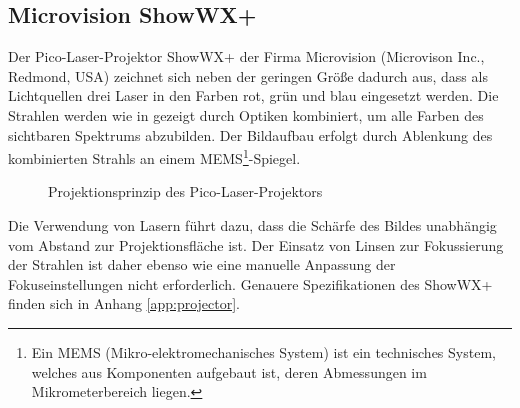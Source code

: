 

\prever{
}

\subsection{Microvision ShowWX+\textsuperscript{\texttrademark}}%
\label{chap.projector}
Der Pico-Laser-Projektor ShowWX+\textsuperscript{\texttrademark} der Firma Microvision (Microvison Inc., Redmond, USA) zeichnet sich neben der geringen Größe dadurch aus, dass als Lichtquellen drei Laser in den Farben rot, grün und blau eingesetzt werden. Die Strahlen werden wie in  gezeigt durch Optiken kombiniert, um alle Farben des sichtbaren Spektrums abzubilden. Der Bildaufbau erfolgt durch Ablenkung des kombinierten Strahls an einem MEMS\footnote{Ein MEMS (Mikro-elektromechanisches System) ist ein technisches System, welches aus Komponenten aufgebaut ist, deren Abmessungen im Mikrometerbereich liegen.}-Spiegel.


\begin{figure}[ht]
	\begin{center}
		\caption{Projektionsprinzip des Pico-Laser-Projektors}
		\label{fig.projtech}
	\end{center}
\end{figure}

\prever{
}

Die Verwendung von Lasern führt dazu, dass die Schärfe des Bildes unabhängig vom Abstand zur Projektionsfläche ist. Der Einsatz von Linsen zur Fokussierung der Strahlen ist daher ebenso wie eine manuelle Anpassung der Fokuseinstellungen nicht erforderlich. Genauere Spezifikationen des ShowWX+\textsuperscript{\texttrademark} finden sich in Anhang \ref{app:projector}.


